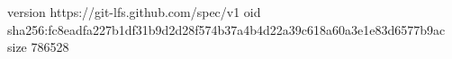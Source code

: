 version https://git-lfs.github.com/spec/v1
oid sha256:fc8eadfa227b1df31b9d2d28f574b37a4b4d22a39c618a60a3e1e83d6577b9ac
size 786528
